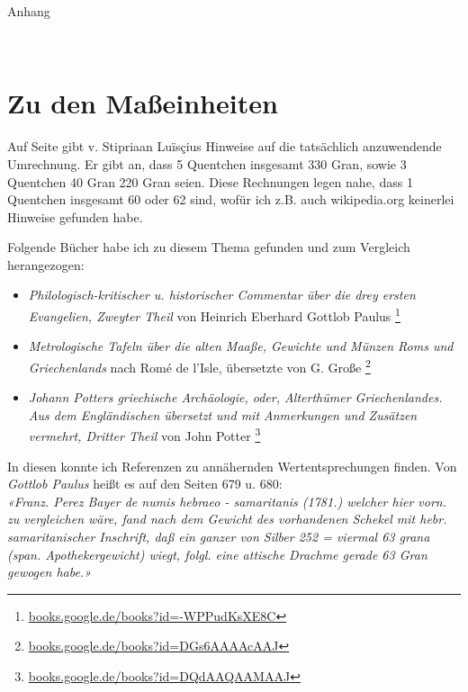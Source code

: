 \documentclass[a5paper,fontsize=10pt]{memoir}
\begin{document}
{\centering
{\Large Anhang}
\vspace{2em}

\begin{minipage}{4cm}
  \hrulefill\\
\end{minipage}

}

\section{Zu den Maßeinheiten}

Auf Seite \pageref{units_value_page} gibt
v. Stipriaan Luïsçius
Hinweise auf die tatsächlich anzuwendende Umrechnung.
Er gibt an,
dass 5  Quentchen insgesamt 330 Gran,
sowie 3 Quentchen 40 Gran 220 Gran seien.
Diese Rechnungen
legen nahe, dass 1 Quentchen insgesamt 60 oder 62 sind,
wofür ich z.B. auch wikipedia.org keinerlei Hinweise gefunden habe.

Folgende Bücher habe ich zu diesem Thema gefunden
und zum Vergleich herangezogen:
\begin{itemize}
\item \emph{Philologisch-kritischer u. historischer Commentar
über die drey ersten Evangelien, Zweyter Theil}
von Heinrich Eberhard Gottlob Paulus%
\footnote{\href{https://books.google.de/books?id=-WPPudKsXE8C}
{books.google.de/books?id=-WPPudKsXE8C}}
\item \emph{Metrologische Tafeln über die alten Maaße,
Gewichte und Münzen Roms und Griechenlands}
nach Romé de l'Isle,
übersetzte von G. Große%
\footnote{\href{https://books.google.de/books?id=DGs6AAAAcAAJ}
{books.google.de/books?id=DGs6AAAAcAAJ}}
\item \emph{Johann Potters griechische Archäologie,
oder, Alterthümer Griechenlandes.
Aus dem Engländischen übersetzt
und mit Anmerkungen und Zusätzen vermehrt, Dritter Theil}
von John Potter%
\footnote{\href{https://books.google.de/books?id=DQdAAQAAMAAJ}{books.google.de/books?id=DQdAAQAAMAAJ}}
\end{itemize}
In diesen konnte ich Referenzen zu annähernden Wertentsprechungen finden.
Von \emph{Gottlob Paulus} heißt es auf den Seiten 679 u. 680:\\

\emph{«Franz. Perez Bayer de numis hebraeo - samaritanis (1781.)
welcher hier vorn. zu vergleichen wäre,
fand nach dem Gewicht des vorhandenen Schekel
mit hebr. samaritanischer Inschrift,
daß ein ganzer von Silber
252 = viermal 63 grana (span. Apothekergewicht) wiegt,
folgl. eine attische Drachme gerade 63 Gran gewogen habe.»}\\
\end{document}

